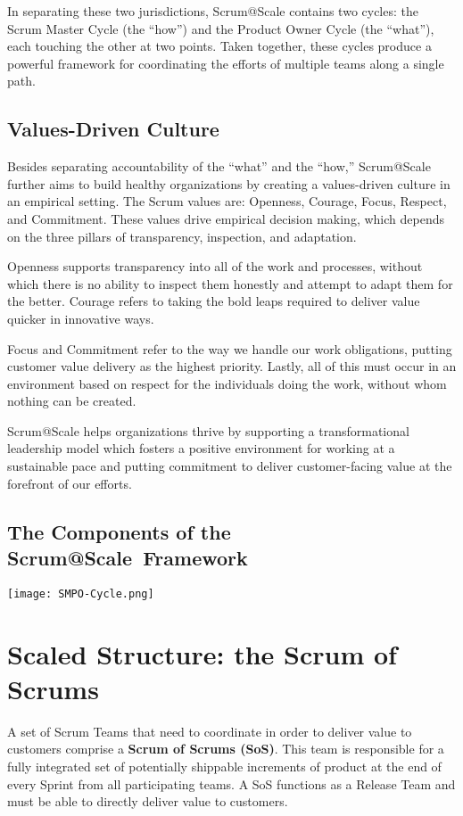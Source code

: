 \documentclass[12pt,a4paper,parskip=full]{scrartcl}
\begin{document}
In separating these two jurisdictions, Scrum@Scale contains two cycles: the Scrum Master Cycle (the ``how'') and the Product Owner Cycle (the ``what''), each touching the other at two points. Taken together, these cycles produce a powerful framework for coordinating the efforts of multiple teams along a single path.

\subsection{Values-Driven Culture}

Besides separating accountability of the ``what'' and the ``how,'' Scrum@Scale further aims to build healthy organizations by creating a values-driven culture in an empirical setting. The Scrum values are: Openness, Courage, Focus, Respect, and Commitment. These values drive empirical decision making, which depends on the three pillars of transparency, inspection, and adaptation.

Openness supports transparency into all of the work and processes, without which there is no ability to inspect them honestly and attempt to adapt them for the better. Courage refers to taking the bold leaps required to deliver value quicker in innovative ways.

Focus and Commitment refer to the way we handle our work obligations, putting customer value delivery as the highest priority. Lastly, all of this must occur in an environment based on respect for the individuals doing the work, without whom nothing can be created.

Scrum@Scale helps organizations thrive by supporting a transformational leadership model which fosters a positive environment for working at a sustainable pace and putting commitment to deliver customer-facing value at the forefront of our efforts.

\subsection{The Components of the Scrum@Scale\textregistered ~Framework}

\texttt{[image: SMPO-Cycle.png]}

\section{Scaled Structure: the Scrum of Scrums}

A set of Scrum Teams that need to coordinate in order to deliver value to customers comprise a \textbf{Scrum of Scrums (SoS)}. This team is responsible for a fully integrated set of potentially shippable increments of product at the end of every Sprint from all participating teams. A SoS functions as a Release Team and must be able to directly deliver value to customers.
\end{document}
